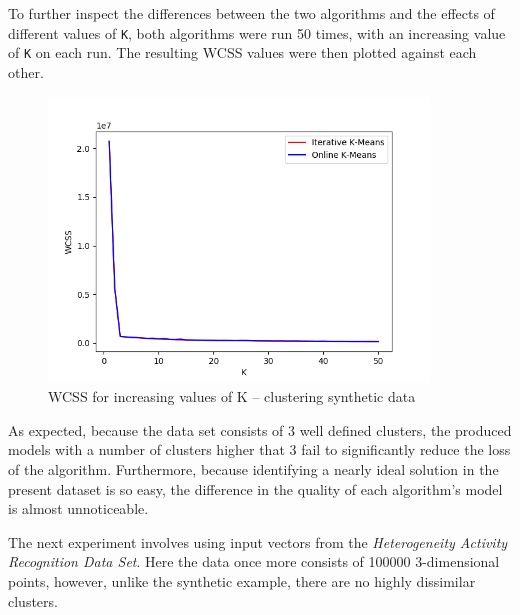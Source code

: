 \documentclass{l4proj}
\begin{document}
To further inspect the differences between the two algorithms and the effects of different values of \texttt{K}, both algorithms were run 50 times, with an increasing value of \texttt{K} on each run. The resulting WCSS values were then plotted against each other.

\begin{figure}[H]
	\centering
    \label{fig:res1}
    \includegraphics[width=0.9\textwidth]{images/result1}
    \caption{WCSS for increasing values of K -- clustering synthetic data} 
\end{figure}

As expected, because the data set consists of 3 well defined clusters, the produced models with a number of clusters higher that 3 fail to significantly reduce the loss of the algorithm. Furthermore, because identifying a nearly ideal solution in the present dataset is so easy, the difference in the quality of each algorithm's model is almost unnoticeable.

The next experiment involves using input vectors from the \textit{Heterogeneity Activity Recognition Data Set}. Here the data once more consists of 100000 3-dimensional points, however, unlike the synthetic example, there are no highly dissimilar clusters. 
\end{document}
